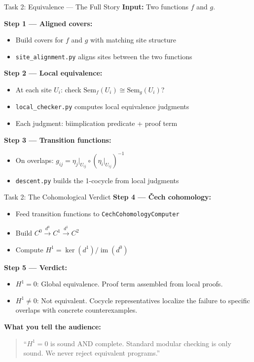 \documentclass[aspectratio=169,10pt]{beamer}
\newcommand{\Sem}{\mathrm{Sem}}
\newcommand{\im}{\operatorname{im}}
\begin{document}
\begin{frame}{Task 2: Equivalence — The Full Story}
\textbf{Input:} Two functions $f$ and $g$.

\textbf{Step 1 --- Aligned covers:}
\begin{itemize}
  \item Build covers for $f$ and $g$ with matching site structure
  \item \texttt{site\_alignment.py} aligns sites between the two functions
\end{itemize}

\textbf{Step 2 --- Local equivalence:}
\begin{itemize}
  \item At each site $U_i$: check $\Sem_f(U_i) \cong \Sem_g(U_i)$?
  \item \texttt{local\_checker.py} computes local equivalence judgments
  \item Each judgment: biimplication predicate + proof term
\end{itemize}

\textbf{Step 3 --- Transition functions:}
\begin{itemize}
  \item On overlaps: $g_{ij} = \eta_j|_{U_{ij}} \circ (\eta_i|_{U_{ij}})^{-1}$
  \item \texttt{descent.py} builds the 1-cocycle from local judgments
\end{itemize}
\end{frame}

\begin{frame}{Task 2: The Cohomological Verdict}
\textbf{Step 4 --- \v{C}ech cohomology:}
\begin{itemize}
  \item Feed transition functions to \texttt{CechCohomologyComputer}
  \item Build $C^0 \xrightarrow{d^0} C^1 \xrightarrow{d^1} C^2$
  \item Compute $H^1 = \ker(d^1) / \im(d^0)$
\end{itemize}

\textbf{Step 5 --- Verdict:}
\begin{itemize}
  \item $H^1 = 0$: \textcolor{good}{Global equivalence.} Proof term assembled from local proofs.
  \item $H^1 \neq 0$: \textcolor{exred}{Not equivalent.} Cocycle representatives localize the failure to specific overlaps with concrete counterexamples.
\end{itemize}

\textbf{What you tell the audience:}
\begin{quote}
``$H^1 = 0$ is sound AND complete. Standard modular checking is only sound. We never reject equivalent programs.''
\end{quote}
\end{frame}
\end{document}
